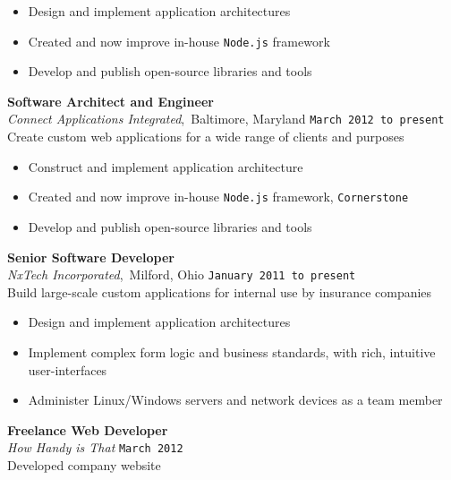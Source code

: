 \documentclass[11pt, line]{res}
\begin{document}
\begin{resume}
				\begin{itemize}
					\item Design and implement application architectures
					\item Created and now improve in-house \texttt{Node.js} framework
					\item Develop and publish open-source libraries and tools
				\end{itemize}

			\vspace{-4pt}
				\textbf{Software Architect and Engineer} \\
				\textit{Connect Applications Integrated},\, Baltimore, Maryland
					\hfill \texttt{March 2012 to present} \\
				Create custom web applications for a wide range of clients and purposes

				\begin{itemize}
					\item Construct and implement  application architecture
					\item Created and now improve in-house \texttt{Node.js} framework, \texttt{Cornerstone}
					\item Develop and publish open-source libraries and tools
				\end{itemize}

			\vspace{-4pt}
				\textbf{Senior Software Developer} \\
				\textit{NxTech Incorporated},\, Milford, Ohio
					\hfill \texttt{January 2011 to present} \\
					Build large-scale custom applications for internal use by insurance companies

				\begin{itemize}
					\item Design and implement application architectures
					\item Implement complex form logic and business standards, with rich, intuitive user-interfaces
					\item Administer Linux/Windows servers and network devices as a team member
				\end{itemize}

			\vspace{-4pt}
				\textbf{Freelance Web Developer} \\
				\textit{How Handy is That}
					\hfill \texttt{March 2012} \\
				Developed company website


\end{resume}
\end{document}
